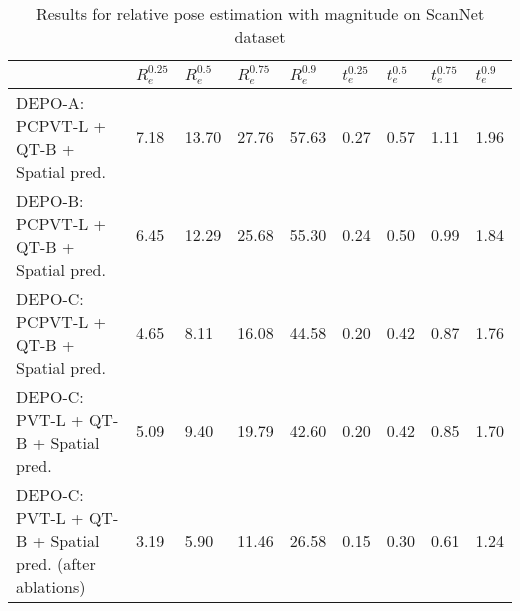 \begin{table}[h!]
\centering
\caption{Results for relative pose estimation with magnitude on ScanNet dataset}
\label{tab:scannet_abs}
\begin{tabular}{lllllllll}
\toprule
 & $R_e^0.25$ & $R_e^0.5$ & $R_e^0.75$ & $R_e^0.9$ & $t_e^0.25$ & $t_e^0.5$ & $t_e^0.75$ & $t_e^0.9$ \\
\midrule
DEPO-A: PCPVT-L + QT-B + Spatial pred. & {\cellcolor[HTML]{A50026}} \color[HTML]{F1F1F1} 7.18 & {\cellcolor[HTML]{A50026}} \color[HTML]{F1F1F1} 13.70 & {\cellcolor[HTML]{A50026}} \color[HTML]{F1F1F1} 27.76 & {\cellcolor[HTML]{A50026}} \color[HTML]{F1F1F1} 57.63 & {\cellcolor[HTML]{A50026}} \color[HTML]{F1F1F1} 0.27 & {\cellcolor[HTML]{A50026}} \color[HTML]{F1F1F1} 0.57 & {\cellcolor[HTML]{A50026}} \color[HTML]{F1F1F1} 1.11 & {\cellcolor[HTML]{A50026}} \color[HTML]{F1F1F1} 1.96 \\
DEPO-B: PCPVT-L + QT-B + Spatial pred. & {\cellcolor[HTML]{EB5A3A}} \color[HTML]{F1F1F1} 6.45 & {\cellcolor[HTML]{ED5F3C}} \color[HTML]{F1F1F1} 12.29 & {\cellcolor[HTML]{DE402E}} \color[HTML]{F1F1F1} 25.68 & {\cellcolor[HTML]{CA2427}} \color[HTML]{F1F1F1} 55.30 & {\cellcolor[HTML]{E65036}} \color[HTML]{F1F1F1} 0.24 & {\cellcolor[HTML]{F7814C}} \color[HTML]{F1F1F1} 0.50 & {\cellcolor[HTML]{F67C4A}} \color[HTML]{F1F1F1} 0.99 & {\cellcolor[HTML]{EC5C3B}} \color[HTML]{F1F1F1} 1.84 \\
DEPO-C: PCPVT-L + QT-B + Spatial pred. & {\cellcolor[HTML]{DFF293}} \color[HTML]{000000} 4.65 & {\cellcolor[HTML]{A5D86A}} \color[HTML]{000000} 8.11 & {\cellcolor[HTML]{9BD469}} \color[HTML]{000000} 16.08 & {\cellcolor[HTML]{FEE695}} \color[HTML]{000000} 44.58 & {\cellcolor[HTML]{FEE797}} \color[HTML]{000000} 0.20 & {\cellcolor[HTML]{FFFAB6}} \color[HTML]{000000} 0.42 & {\cellcolor[HTML]{FFF8B4}} \color[HTML]{000000} 0.87 & {\cellcolor[HTML]{FBA35C}} \color[HTML]{000000} 1.76 \\
DEPO-C: PVT-L + QT-B + Spatial pred. & {\cellcolor[HTML]{FFFAB6}} \color[HTML]{000000} 5.09 & {\cellcolor[HTML]{F1F9AC}} \color[HTML]{000000} 9.40 & {\cellcolor[HTML]{FFFCBA}} \color[HTML]{000000} 19.79 & {\cellcolor[HTML]{FFFAB6}} \color[HTML]{000000} 42.60 & {\cellcolor[HTML]{FEEC9F}} \color[HTML]{000000} 0.20 & {\cellcolor[HTML]{FFF6B0}} \color[HTML]{000000} 0.42 & {\cellcolor[HTML]{F8FCB6}} \color[HTML]{000000} 0.85 & {\cellcolor[HTML]{FECA79}} \color[HTML]{000000} 1.70 \\
DEPO-C: PVT-L + QT-B + Spatial pred. (after ablations) & {\cellcolor[HTML]{138C4A}} \color[HTML]{F1F1F1} 3.19 & {\cellcolor[HTML]{05713C}} \color[HTML]{F1F1F1} 5.90 & {\cellcolor[HTML]{006837}} \color[HTML]{F1F1F1} 11.46 & {\cellcolor[HTML]{006837}} \color[HTML]{F1F1F1} 26.58 & {\cellcolor[HTML]{96D268}} \color[HTML]{000000} 0.15 & {\cellcolor[HTML]{3FAA59}} \color[HTML]{F1F1F1} 0.30 & {\cellcolor[HTML]{06733D}} \color[HTML]{F1F1F1} 0.61 & {\cellcolor[HTML]{006837}} \color[HTML]{F1F1F1} 1.24 \\

\end{tabular}
\end{table}
